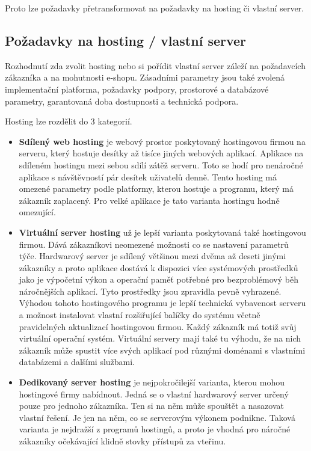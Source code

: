 \documentclass[11pt,twoside,a4paper]{book}
\begin{document}
Proto lze požadavky přetransformovat na požadavky na hosting či vlastní server.

\subsection{Požadavky na hosting / vlastní server}
Rozhodnutí zda zvolit hosting nebo si pořídit vlastní server záleží na požadavcích zákazníka a na mohutnosti e-shopu. Zásadními parametry jsou také zvolená implementační platforma, požadavky podpory, prostorové a databázové parametry, garantovaná doba dostupnosti a technická podpora.

Hosting lze rozdělit do 3 kategorií.

\begin{itemize}
\item \textbf{Sdílený web hosting} je webový prostor poskytovaný hostingovou firmou na serveru, který hostuje desítky až tisíce jiných webových aplikací. Aplikace na sdíleném hostingu mezi sebou sdílí zátěž serveru. Toto se hodí pro nenáročné aplikace s návštěvností pár desítek uživatelů denně. Tento hosting má omezené parametry podle platformy, kterou hostuje a programu, který má zákazník zaplacený. Pro velké aplikace je tato varianta hostingu hodně omezující.

\item \textbf{Virtuální server hosting} už je lepší varianta poskytovaná také hostingovou firmou. Dává zákazníkovi neomezené možnosti co se nastavení parametrů týče. Hardwarový server je sdílený většinou mezi dvěma až deseti jinými zákazníky a proto aplikace dostává k dispozici více systémových prostředků jako je výpočetní výkon a operační paměť potřebné pro bezproblémový běh náročnějších aplikací. Tyto prostředky jsou zpravidla pevně vyhrazené. Výhodou tohoto hostingového programu je lepší technická vybavenost serveru a možnost instalovat vlastní rozšiřující balíčky do systému včetně pravidelných aktualizací hostingovou firmou. Každý zákazník má totiž svůj virtuální operační systém. Virtuální servery mají také tu výhodu, že na nich zákazník může spustit více svých aplikací pod různými doménami s vlastními databázemi a dalšími službami.

\item \textbf{Dedikovaný server hosting}  je nejpokročilejší varianta, kterou mohou hostingové firmy nabídnout. Jedná se o vlastní hardwarový server určený pouze pro jednoho zákazníka. Ten si na něm může spouštět a nasazovat vlastní řešení. Je jen na něm, co se serverovým výkonem podnikne. Taková varianta je nejdražší z programů hostingů, a proto je vhodná pro náročné zákazníky očekávající klidně stovky přístupů za vteřinu. 

\end{itemize}
\end{document}
